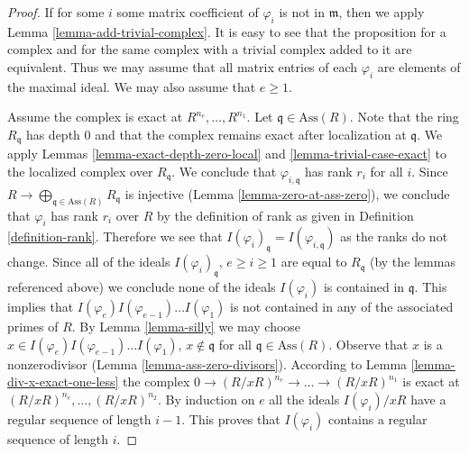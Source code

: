 \begin{proof}
If for some $i$ some matrix coefficient of $\varphi_i$
is not in $\mathfrak m$, then we apply Lemma \ref{lemma-add-trivial-complex}.
It is easy to see that the proposition for a complex and
for the same complex with a trivial complex added to it
are equivalent. Thus we may assume that all matrix entries
of each $\varphi_i$ are elements of the maximal ideal.
We may also assume that $e \geq 1$.

\medskip\noindent
Assume the complex is exact at $R^{n_e}, \ldots, R^{n_1}$.
Let $\mathfrak q \in \text{Ass}(R)$.
Note that the ring $R_{\mathfrak q}$ has depth $0$
and that the complex remains exact after localization at $\mathfrak q$.
We apply Lemmas \ref{lemma-exact-depth-zero-local} and
\ref{lemma-trivial-case-exact} to the localized complex
over $R_{\mathfrak q}$. We conclude that
$\varphi_{i, \mathfrak q}$ has rank $r_i$ for all $i$.
Since $R \to \bigoplus_{\mathfrak q \in \text{Ass}(R)} R_\mathfrak q$
is injective (Lemma \ref{lemma-zero-at-ass-zero}), we conclude that
$\varphi_i$ has rank $r_i$ over $R$ by the definition of rank as given
in Definition \ref{definition-rank}. Therefore we see that
$I(\varphi_i)_\mathfrak q = I(\varphi_{i, \mathfrak q})$
as the ranks do not change. Since all of the ideals
$I(\varphi_i)_{\mathfrak q}$, $e \geq i \geq 1$
are equal to $R_{\mathfrak q}$ (by the lemmas referenced above)
we conclude none of the ideals $I(\varphi_i)$ is contained in $\mathfrak q$.
This implies that $I(\varphi_e)I(\varphi_{e-1})\ldots I(\varphi_1)$
is not contained in any of the associated primes
of $R$. By Lemma \ref{lemma-silly} we may choose
$x \in I(\varphi_e)I(\varphi_{e - 1})\ldots I(\varphi_1)$,
$x \not \in \mathfrak q$ for all $\mathfrak q \in \text{Ass}(R)$.
Observe that $x$ is a nonzerodivisor (Lemma \ref{lemma-ass-zero-divisors}).
According to Lemma \ref{lemma-div-x-exact-one-less}
the complex $0 \to (R/xR)^{n_e} \to \ldots \to (R/xR)^{n_1}$ is exact
at $(R/xR)^{n_e}, \ldots, (R/xR)^{n_2}$. By induction
on $e$ all the ideals $I(\varphi_i)/xR$ have a regular
sequence of length $i - 1$. This proves that $I(\varphi_i)$
contains a regular sequence of length $i$.


\end{proof}
